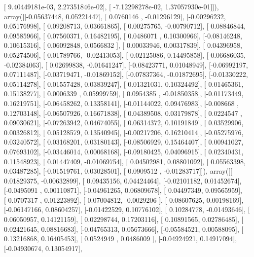 \documentclass{article}
\begin{document}
       [  9.40449181e-03,   2.27351846e-02],
       [ -7.12298278e-02,   1.37057930e-01]]), array([[-0.05637448,  0.05221447],
       [ 0.0760146 , -0.01296129],
       [-0.00296232,  0.05176998],
       [ 0.09208713,  0.03661865],
       [ 0.00275765, -0.00790712],
       [ 0.08846844,  0.09585966],
       [ 0.07560371,  0.16482195],
       [ 0.0486071 ,  0.10300966],
       [-0.08146248,  0.10615316],
       [ 0.06092848,  0.0566832 ],
       [ 0.00033946,  0.00317839],
       [ 0.04396958,  0.05274506],
       [-0.01789766, -0.02413053],
       [-0.02125086,  0.14495858],
       [-0.06686035, -0.02384063],
       [ 0.02699838, -0.01641247],
       [-0.08423771,  0.01048949],
       [-0.06992197,  0.07111487],
       [-0.03719471, -0.01869152],
       [-0.07837364, -0.01872695],
       [-0.01330222,  0.05114278],
       [ 0.01557428,  0.03839247],
       [ 0.01321031,  0.10324492],
       [ 0.01465361,  0.15138277],
       [ 0.0006339 ,  0.05999759],
       [ 0.0954385 , -0.01850358],
       [-0.01173449,  0.16219751],
       [-0.06458262,  0.13358141],
       [-0.01144022,  0.09476983],
       [-0.008668  ,  0.12703148],
       [-0.06507926,  0.16671838],
       [ 0.04389508,  0.03179878],
       [ 0.0224547 ,  0.09030621],
       [-0.07263942,  0.04674055],
       [ 0.06314372,  0.10191849],
       [ 0.03529906,  0.00326812],
       [ 0.05128579,  0.13540945],
       [-0.00217206,  0.16210414],
       [-0.05275976,  0.03240572],
       [ 0.03168201,  0.03180143],
       [-0.08506929,  0.15464407],
       [ 0.00941027,  0.07693102],
       [-0.03446014,  0.00068168],
       [-0.09180425,  0.04096915],
       [ 0.02340431,  0.11548923],
       [ 0.01447409, -0.01069754],
       [ 0.04502981,  0.08801092],
       [ 0.05563398,  0.03487285],
       [-0.01519761,  0.03028501],
       [ 0.0909512 , -0.01283717]]), array([[ 0.01829375, -0.00632899],
       [ 0.09435156,  0.04424464],
       [-0.02101182,  0.01452674],
       [-0.0495091 ,  0.00110871],
       [-0.04961265,  0.06809678],
       [ 0.04497349,  0.09565959],
       [-0.0707317 ,  0.01223892],
       [-0.07004812, -0.0029206 ],
       [ 0.08607625,  0.00198169],
       [-0.06147166,  0.08604257],
       [-0.01422529,  0.10776102],
       [ 0.10284778, -0.01493646],
       [ 0.06050957,  0.14121159],
       [ 0.02298744,  0.17203116],
       [ 0.10891565,  0.02786485],
       [ 0.02421645,  0.08816683],
       [-0.04765313,  0.05673666],
       [-0.05584521,  0.00588095],
       [ 0.13216868,  0.16405453],
       [ 0.0524949 ,  0.0486009 ],
       [-0.04924921,  0.14917094],
       [-0.04930674,  0.13054917],
\end{document}
